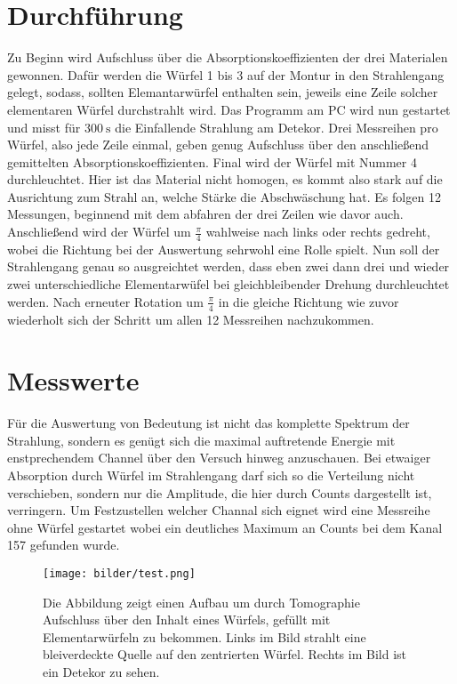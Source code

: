 \section{Durchführung}
Zu Beginn wird Aufschluss über die Absorptionskoeffizienten der drei Materialen gewonnen. 
Dafür werden die Würfel 1 bis 3 auf der Montur in den Strahlengang gelegt, sodass, sollten Elemantarwürfel enthalten sein, jeweils eine Zeile solcher elementaren Würfel 
durchstrahlt wird. Das Programm am PC wird nun gestartet und misst für $\SI{300}{\second}$ die Einfallende Strahlung am Detekor. Drei Messreihen pro Würfel, also jede Zeile einmal, geben genug Aufschluss über den anschließend gemittelten Absorptionskoeffizienten.
Final wird der Würfel mit Nummer 4 durchleuchtet. Hier ist das Material nicht homogen, es kommt also stark auf die Ausrichtung zum Strahl an, welche Stärke
die Abschwäschung hat. Es folgen 12 Messungen, beginnend mit dem abfahren der drei Zeilen wie davor auch. Anschließend wird der Würfel um 
$\frac{\pi}{4}$ wahlweise nach links oder rechts gedreht, wobei die Richtung bei der Auswertung sehrwohl eine Rolle spielt.
Nun soll der Strahlengang genau so ausgreichtet werden, dass eben zwei dann drei und wieder zwei unterschiedliche Elementarwüfel bei gleichbleibender Drehung
durchleuchtet werden. Nach erneuter Rotation um $\frac{\pi}{4}$ in die gleiche Richtung wie zuvor wiederholt sich der Schritt um 
allen 12 Messreihen nachzukommen.

\section{Messwerte}
Für die Auswertung von Bedeutung ist nicht das komplette Spektrum der Strahlung, sondern es genügt sich die maximal auftretende Energie mit enstprechendem
Channel über den Versuch hinweg anzuschauen. Bei etwaiger Absorption durch Würfel im Strahlengang darf sich so die Verteilung nicht verschieben, sondern 
nur die Amplitude, die hier durch Counts dargestellt ist, verringern.
Um Festzustellen welcher Channal sich eignet wird eine Messreihe ohne Würfel gestartet wobei ein deutliches Maximum  an Counts bei dem Kanal 157 gefunden wurde.


\begin{figure}
    \centering
    \texttt{[image: bilder/test.png]}
    \caption{Die Abbildung zeigt einen Aufbau um durch Tomographie Aufschluss über den Inhalt eines Würfels, gefüllt mit Elementarwürfeln zu bekommen.
    Links im Bild strahlt eine bleiverdeckte Quelle auf den zentrierten Würfel. Rechts im Bild ist ein Detekor zu sehen. \cite{skript}}
    \label{fig:1}
\end{figure}
